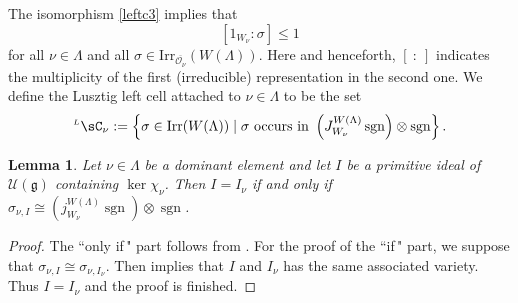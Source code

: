 \documentclass[12pt,a4paper]{amsart}
\newcommand{\CC}{{\mathcal {C}}}
\newcommand{\CH}{{\mathcal {H}}}
\newcommand{\CO}{{\mathcal {O}}}
\newcommand{\CU}{{\mathcal {U}}}
\newcommand{\sgn}{\operatorname{sgn}}
\newcommand{\oS}{\operatorname{S}}
\newcommand{\g}{\mathfrak g}
\newcommand{\h}{\mathfrak h}
\renewcommand{\c}{\mathfrak c}
\newcommand{\be}{\begin {equation}}
\newcommand{\ee}{\end {equation}}
\numberwithin{equation}{section}
\newtheorem{lem}[thm]{Lemma}
\theoremstyle{remark}
\def\Irr{\mathrm{Irr}}
\def\hha{{}^a\fhh}
\def\LC{{}^{\scriptscriptstyle L}\sC}
\begin{document}
The isomorphism \eqref{leftc3} implies that
\be\label{mulone}
 [1_{W_\nu} :\sigma]\leq 1
 \ee
for all $\nu\in \Lambda$ and all $ \sigma\in \Irr_{\overline{\CO_\nu}}(W(\Lambda))$.
 Here and henceforth, $[\ : \ ]$ indicates the multiplicity of the first
(irreducible) representation in the second one.
We define the Lusztig left cell attached to $\nu\in \Lambda$ to be the set
\be \label{ll}
\LC_{\nu}:=\left\{\sigma\in \Irr(W(\Lambda))\mid \sigma \textrm{ occurs in } \left(J_{W_{\nu}}^{W(\Lambda)} \sgn \right)\otimes \sgn\right \}.
\ee




\begin{lem}\label{leftcnu2}
Let $\nu\in \Lambda$ be a dominant element and let $I$ be a primitive ideal of $\CU(\g)$ containing $\ker \chi_\nu$.    Then $I=I_\nu$ if and only if $\sigma_{\nu, I}\cong \left(j_{W_{\nu}}^{W(\Lambda)} \sgn \right)\otimes \sgn$.




\end{lem}
\begin{proof}
The ``only if$\,$" part  follows from . For the proof of the ``if$\,$" part, we suppose that $\sigma_{\nu, I}\cong \sigma_{\nu, I_\nu}$. Then  implies that $I$ and $I_\nu$ has the same associated variety. Thus $I=I_\nu$ and the proof is finished.

\end{proof}







\end{document}

